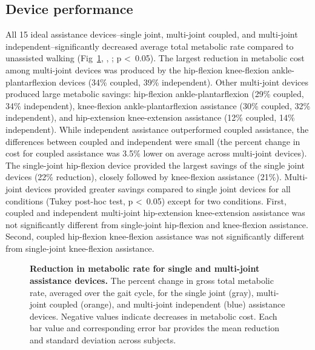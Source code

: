 \documentclass[10pt,letterpaper]{article}
\providecommand{\DIFaddtex}[1]{{\protect\color{blue}{#1}}} %
\providecommand{\DIFaddFL}[1]{\DIFadd{#1}} %
\providecommand{\DIFaddbeginFL}{} %
\providecommand{\DIFaddendFL}{} %
\providecommand{\DIFadd}[1]{\texorpdfstring{\DIFaddtex{#1}}{#1}} %
\newcommand{\DIFaddincludegraphics}[2][]{{\color{blue}\fbox{\DIFOincludegraphics[#1]{#2}}}} %
\DeclareRobustCommand{\DIFaddbeginFL}{\DIFOaddbeginFL \let\includegraphics\DIFaddincludegraphics} %
\DeclareRobustCommand{\DIFaddendFL}{\DIFOaddendFL \let\includegraphics\DIFOincludegraphics} %
\begin{document}
\subsection*{Device performance}
All 15 ideal assistance devices--single joint, multi-joint coupled, and multi-joint independent--significantly decreased average total metabolic rate compared to unassisted walking (Fig~\ref{Fig1}, , ; p \textless~0.05). The largest reduction in metabolic cost among multi-joint devices was produced by the hip-flexion knee-flexion ankle-plantarflexion devices (34\% coupled, 39\% independent). Other multi-joint devices produced large metabolic savings: hip-flexion ankle-plantarflexion (29\% coupled, 34\% independent), knee-flexion ankle-plantarflexion assistance (30\% coupled, 32\% independent), and hip-extension knee-extension assistance (12\% coupled, 14\% independent). While independent assistance outperformed coupled assistance, the differences between coupled and independent were small (the percent change in cost for coupled assistance was 3.5\% lower on average across multi-joint devices). The single-joint hip-flexion device provided the largest savings of the single joint devices (22\% reduction), closely followed by knee-flexion assistance (21\%). Multi-joint devices provided greater savings compared to single joint devices for all conditions (Tukey post-hoc test, p \textless~0.05) except for two conditions. First, coupled and independent multi-joint hip-extension knee-extension assistance was not significantly different from single-joint hip-flexion and knee-flexion assistance. Second, coupled hip-flexion knee-flexion assistance was not significantly different from single-joint knee-flexion assistance.  

\begin{figure}[!h]
\begin{adjustwidth}{-1in}{0in} %
    \centering
    \caption{{\bf Reduction in metabolic rate for single and multi-joint assistance devices.}
        The percent change in gross total metabolic rate, averaged over the gait cycle, for the single joint (gray), multi-joint coupled (orange), and multi-joint independent (blue) assistance devices. Negative values indicate decreases in metabolic cost. Each bar value and corresponding error bar provides the mean reduction and standard deviation across subjects. \DIFaddbeginFL \DIFaddFL{Asterisks indicate devices that produced significantly larger metabolic reductions compared to single-joint devices.}\DIFaddendFL }
\label{Fig1}
\end{adjustwidth}
\end{figure} 
\end{document}
